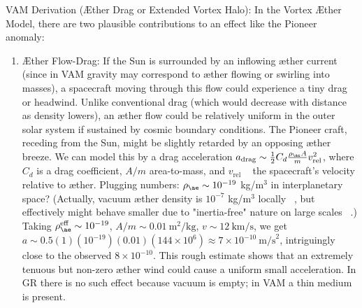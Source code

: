 \documentclass[a4paper, aps,preprint,superscriptaddress, 12pt]{revtex4}
\begin{document}
VAM Derivation (Æther Drag or Extended Vortex Halo): In the Vortex Æther Model, there are two plausible contributions to an effect like the Pioneer anomaly:


\begin{enumerate}

\item
Æther Flow-Drag: If the Sun is surrounded by an inflowing æther current (since in VAM gravity may correspond to æther flowing or swirling into masses), a spacecraft moving through this flow could experience a tiny drag or headwind. Unlike conventional drag (which would decrease with distance as density lowers), an æther flow could be relatively uniform in the outer solar system if sustained by cosmic boundary conditions. The Pioneer craft, receding from the Sun, might be slightly retarded by an opposing æther breeze. We can model this by a drag acceleration $a_{\text{drag}} \sim \frac{1}{2}C_d \frac{\rho_{\ae} A}{m} v_{\text{rel}}^2$, where $C_d$ is a drag coefficient, $A/m$ area-to-mass, and $v_{\text{rel}}$ ~ the spacecraft’s velocity relative to æther. Plugging numbers: $\rho_{\ae}\sim10^{-19}$ kg/m$^3$ in interplanetary space? (Actually, vacuum æther density is $10^{-7}$ kg/m$^3$ locally~\cite{VAM_constants} , but effectively might behave smaller due to "inertia-free" nature on large scales~\cite{Iskandarani2025b} .) Taking $\rho_{\ae}^{\text{eff}}\sim10^{-19}$, $A/m\sim0.01~\text{m}^2/\text{kg}$, $v\sim12~\text{km/s}$, we get $a\sim0.5(1)(10^{-19})(0.01)(144\times10^6) \approx7\times10^{-10}~\text{m/s}^2$, intriguingly close to the observed $8\times10^{-10}$. This rough estimate shows that an extremely tenuous but non-zero æther wind could cause a uniform small acceleration. In GR there is no such effect because vacuum is empty; in VAM a thin medium is present.





\end{enumerate}
\end{document}

